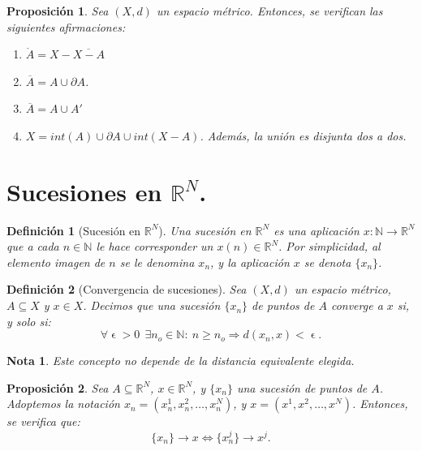 \documentclass[11pt, a4paper, titlepage]{article}
\let\epsilon\upvarepsilon
\theoremstyle{theorem-style}
\newtheorem*{nprop}{Proposición}
\theoremstyle{definition-style}
\newtheorem*{ndef}{Definición}
\theoremstyle{remark-style}
\newtheorem*{nota}{Nota}
\theoremstyle{example-style}
\newenvironment{nlist}
{\begin{enumerate}
\renewcommand\labelenumi{(\emph{\roman{enumi})}}}
{\end{enumerate}}
\begin{document}
\begin{nprop}
Sea $(X,d)$ un espacio métrico. Entonces, se verifican las siguientes afirmaciones:

\begin{nlist}
\item $\mathring{A} = X - \overline{X-A}$

\item $\overline{A} = A \cup \partial A$.

\item $\overline{A} = A \cup A'$

\item $X = int(A) \cup \partial A \cup int(X-A)$. Además, la unión es disjunta dos a dos.
\end{nlist}

\end{nprop}

\newpage


\section{Sucesiones en $\mathbb{R}^N$.}



\begin{ndef}[Sucesión en $\mathbb{R}^N$]
Una sucesión en $\mathbb{R}^N$ es una aplicación $x: \mathbb{N} \longrightarrow \mathbb{R}^N$ que a cada $n\in \mathbb{N}$ le hace corresponder un $x(n) \in \mathbb{R}^N$. Por simplicidad, al elemento imagen de $n$ se le denomina $x_n$, y la aplicación $x$ se denota $\{x_n\}$.
\end{ndef}



\begin{ndef}[Convergencia de sucesiones]
Sea $(X,d)$ un espacio métrico, $A\subseteq X$ y $x\in X$. Decimos que una sucesión $\{x_n\}$ de puntos de $A$ converge a $x$ si, y solo si: $$ \forall \epsilon > 0\ \ \exists n_o \in \mathbb{N}: \ n\ge n_o \Rightarrow d(x_n,x) < \epsilon.$$
\end{ndef}



\begin{nota}
Este concepto no depende de la distancia equivalente elegida.
\end{nota}



\begin{nprop}
Sea $A\subseteq \mathbb{R}^N$, $x\in \mathbb{R}^N$, y $\{x_n\}$ una sucesión de puntos de $A$. Adoptemos la notación $x_n = (x_n^1, x_n^2,\dots,x_n^N)$, y $x=(x^1, x^2,\dots, x^N)$. Entonces, se verifica que:
$$\{x_n\} \rightarrow x \iff \{x_n^j\} \rightarrow x^j.$$
\end{nprop}
\end{document}
